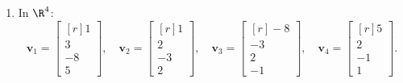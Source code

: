 \documentclass[12pt]{article}
\begin{document}
\begin{enumerate} 

\item In $\R^4$:
\[
\mathbf{v}_1=\begin{bmatrix*}[r] 1\\ 3\\ -8\\ 5\end{bmatrix*},\quad
\mathbf{v}_2=\begin{bmatrix*}[r] 1\\ 2\\ -3\\ 2\end{bmatrix*},\quad
\mathbf{v}_3=\begin{bmatrix*}[r] -8\\ -3\\ 2\\ -1\end{bmatrix*},\quad
\mathbf{v}_4=\begin{bmatrix*}[r] 5\\ 2\\ -1\\ 1\end{bmatrix*}.
\]

\end{enumerate}
\end{document}
